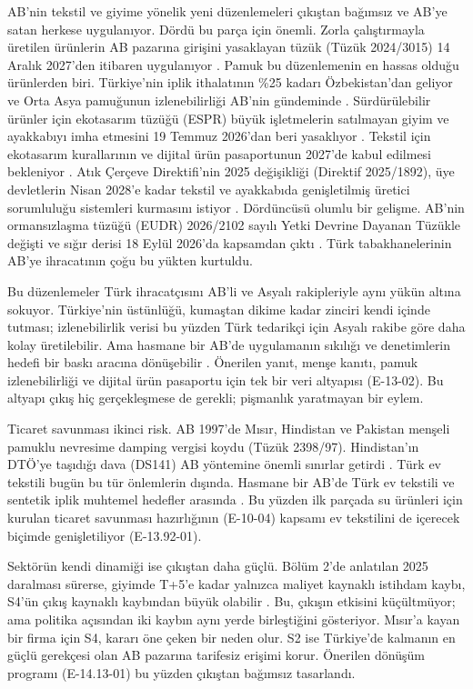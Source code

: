 AB'nin tekstil ve giyime yönelik yeni düzenlemeleri çıkıştan bağımsız ve AB'ye satan herkese uygulanıyor. Dördü bu parça için önemli. Zorla çalıştırmayla üretilen ürünlerin AB pazarına girişini yasaklayan tüzük (Tüzük 2024/3015) 14 Aralık 2027'den itibaren uygulanıyor \etiketV{}. Pamuk bu düzenlemenin en hassas olduğu ürünlerden biri. Türkiye'nin iplik ithalatının \%25 kadarı Özbekistan'dan geliyor ve Orta Asya pamuğunun izlenebilirliği AB'nin gündeminde \etiketH{}. Sürdürülebilir ürünler için ekotasarım tüzüğü (ESPR) büyük işletmelerin satılmayan giyim ve ayakkabıyı imha etmesini 19 Temmuz 2026'dan beri yasaklıyor \etiketV{}. Tekstil için ekotasarım kurallarının ve dijital ürün pasaportunun 2027'de kabul edilmesi bekleniyor \etiketV{}. Atık Çerçeve Direktifi'nin 2025 değişikliği (Direktif 2025/1892), üye devletlerin Nisan 2028'e kadar tekstil ve ayakkabıda genişletilmiş üretici sorumluluğu sistemleri kurmasını istiyor \etiketV{}. Dördüncüsü olumlu bir gelişme. AB'nin ormansızlaşma tüzüğü (EUDR) 2026/2102 sayılı Yetki Devrine Dayanan Tüzükle değişti ve sığır derisi 18 Eylül 2026'da kapsamdan çıktı \etiketV{}. Türk tabakhanelerinin AB'ye ihracatının çoğu bu yükten kurtuldu.

Bu düzenlemeler Türk ihracatçısını AB'li ve Asyalı rakipleriyle aynı yükün altına sokuyor. Türkiye'nin üstünlüğü, kumaştan dikime kadar zinciri kendi içinde tutması; izlenebilirlik verisi bu yüzden Türk tedarikçi için Asyalı rakibe göre daha kolay üretilebilir. Ama hasmane bir AB'de uygulamanın sıkılığı ve denetimlerin hedefi bir baskı aracına dönüşebilir \etiketH{}. Önerilen yanıt, menşe kanıtı, pamuk izlenebilirliği ve dijital ürün pasaportu için tek bir veri altyapısı (E-13-02). Bu altyapı çıkış hiç gerçekleşmese de gerekli; pişmanlık yaratmayan bir eylem.

Ticaret savunması ikinci risk. AB 1997'de Mısır, Hindistan ve Pakistan menşeli pamuklu nevresime damping vergisi koydu (Tüzük 2398/97). Hindistan'ın DTÖ'ye taşıdığı dava (DS141) AB yöntemine önemli sınırlar getirdi \etiketV{}. Türk ev tekstili bugün bu tür önlemlerin dışında. Hasmane bir AB'de Türk ev tekstili ve sentetik iplik muhtemel hedefler arasında \etiketH{}. Bu yüzden ilk parçada su ürünleri için kurulan ticaret savunması hazırlığının (E-10-04) kapsamı ev tekstilini de içerecek biçimde genişletiliyor (E-13.92-01).

Sektörün kendi dinamiği ise çıkıştan daha güçlü. Bölüm 2'de anlatılan 2025 daralması sürerse, giyimde T+5'e kadar yalnızca maliyet kaynaklı istihdam kaybı, S4'ün çıkış kaynaklı kaybından büyük olabilir \etiketH{}. Bu, çıkışın etkisini küçültmüyor; ama politika açısından iki kaybın aynı yerde birleştiğini gösteriyor. Mısır'a kayan bir firma için S4, kararı öne çeken bir neden olur. S2 ise Türkiye'de kalmanın en güçlü gerekçesi olan AB pazarına tarifesiz erişimi korur. Önerilen dönüşüm programı (E-14.13-01) bu yüzden çıkıştan bağımsız tasarlandı.

